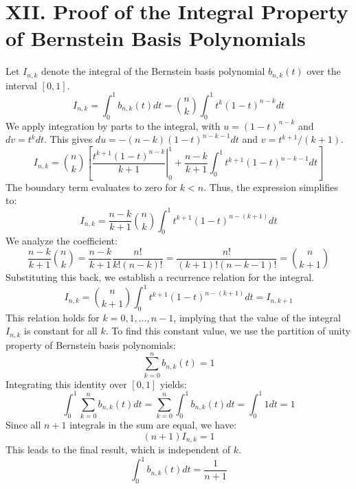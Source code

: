 \documentclass[a4paper]{article}
\begin{document}
\section*{XII. Proof of the Integral Property of Bernstein Basis Polynomials}

Let $I_{n,k}$ denote the integral of the Bernstein basis polynomial $b_{n,k}(t)$ over the interval $[0,1]$.
\[
I_{n,k} = \int_0^1 b_{n,k}(t) dt = \binom{n}{k} \int_0^1 t^k (1-t)^{n-k} dt
\]
We apply integration by parts to the integral, with $u=(1-t)^{n-k}$ and $dv=t^k dt$. This gives $du=-(n-k)(1-t)^{n-k-1}dt$ and $v=t^{k+1}/(k+1)$.
\[
I_{n,k} = \binom{n}{k} \left[ \left. \frac{t^{k+1}(1-t)^{n-k}}{k+1} \right|_0^1 + \frac{n-k}{k+1} \int_0^1 t^{k+1} (1-t)^{n-k-1} dt \right]
\]
The boundary term evaluates to zero for $k < n$. Thus, the expression simplifies to:
\[
I_{n,k} = \frac{n-k}{k+1} \binom{n}{k} \int_0^1 t^{k+1} (1-t)^{n-(k+1)} dt
\]
We analyze the coefficient:
\[
\frac{n-k}{k+1} \binom{n}{k} = \frac{n-k}{k+1} \frac{n!}{k!(n-k)!} = \frac{n!}{(k+1)!(n-k-1)!} = \binom{n}{k+1}
\]
Substituting this back, we establish a recurrence relation for the integral.
\[
I_{n,k} = \binom{n}{k+1} \int_0^1 t^{k+1} (1-t)^{n-(k+1)} dt = I_{n,k+1}
\]
This relation holds for $k = 0, 1, \dots, n-1$, implying that the value of the integral $I_{n,k}$ is constant for all $k$.
To find this constant value, we use the partition of unity property of Bernstein basis polynomials:
\[
\sum_{k=0}^n b_{n,k}(t) = 1
\]
Integrating this identity over $[0,1]$ yields:
\[
\int_0^1 \sum_{k=0}^n b_{n,k}(t) dt = \sum_{k=0}^n \int_0^1 b_{n,k}(t) dt = \int_0^1 1 dt = 1
\]
Since all $n+1$ integrals in the sum are equal, we have:
\[
(n+1) I_{n,k} = 1
\]
This leads to the final result, which is independent of $k$.
\[
\int_0^1 b_{n,k}(t) dt = \frac{1}{n+1}
\]
\end{document}
